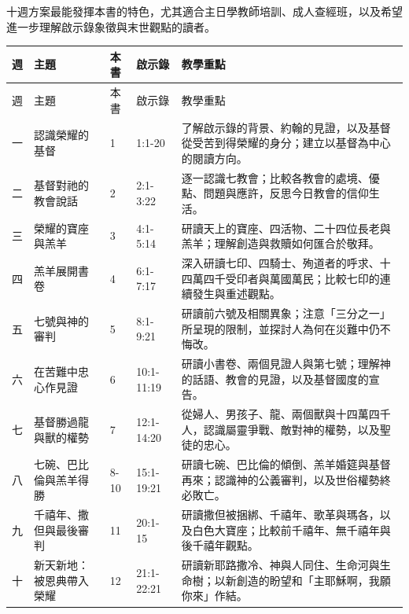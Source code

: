 十週方案最能發揮本書的特色，尤其適合主日學教師培訓、成人查經班，以及希望進一步理解啟示錄象徵與末世觀點的讀者。

{
\renewcommand{\arraystretch}{1}
\begin{longtable}{
  >{\centering\arraybackslash}p{0.5cm}
  p{2cm}
  p{1cm}
  p{1.5cm}
  p{4cm}
}
週 &
主題 &
本書 &
啟示錄 &
教學重點 \\
\hline
\endfirsthead

週 &
主題 &
本書 &
啟示錄 &
教學重點 \\
\hline
\endhead

一 &
認識榮耀的基督 &
1 &
1:1-20 &
了解啟示錄的背景、約翰的見證，以及基督從受苦到得榮耀的身分；建立以基督為中心的閱讀方向。 \\

二 &
基督對祂的教會說話 &
2 &
2:1-3:22 &
逐一認識七教會；比較各教會的處境、優點、問題與應許，反思今日教會的信仰生活。 \\

三 &
榮耀的寶座與羔羊 &
3 &
4:1-5:14 &
研讀天上的寶座、四活物、二十四位長老與羔羊；理解創造與救贖如何匯合於敬拜。 \\

四 &
羔羊展開書卷 &
4 &
6:1-7:17 &
深入研讀七印、四騎士、殉道者的呼求、十四萬四千受印者與萬國萬民；比較七印的連續發生與重述觀點。 \\

五 &
七號與神的審判 &
5 &
8:1-9:21 &
研讀前六號及相關異象；注意「三分之一」所呈現的限制，並探討人為何在災難中仍不悔改。 \\

六 &
在苦難中忠心作見證 &
6 &
10:1-11:19 &
研讀小書卷、兩個見證人與第七號；理解神的話語、教會的見證，以及基督國度的宣告。 \\

七 &
基督勝過龍與獸的權勢 &
7 &
12:1-14:20 &
從婦人、男孩子、龍、兩個獸與十四萬四千人，認識屬靈爭戰、敵對神的權勢，以及聖徒的忠心。 \\

八 &
七碗、巴比倫與羔羊得勝 &
8-10 &
15:1-19:21 &
研讀七碗、巴比倫的傾倒、羔羊婚筵與基督再來；認識神的公義審判，以及世俗權勢終必敗亡。 \\

九 &
千禧年、撒但與最後審判 &
11 &
20:1-15 &
研讀撒但被捆綁、千禧年、歌革與瑪各，以及白色大寶座；比較前千禧年、無千禧年與後千禧年觀點。 \\

十 &
新天新地：被恩典帶入榮耀 &
12 &
21:1-22:21 &
研讀新耶路撒冷、神與人同住、生命河與生命樹；以新創造的盼望和「主耶穌啊，我願你來」作結。 \\

\end{longtable}

}